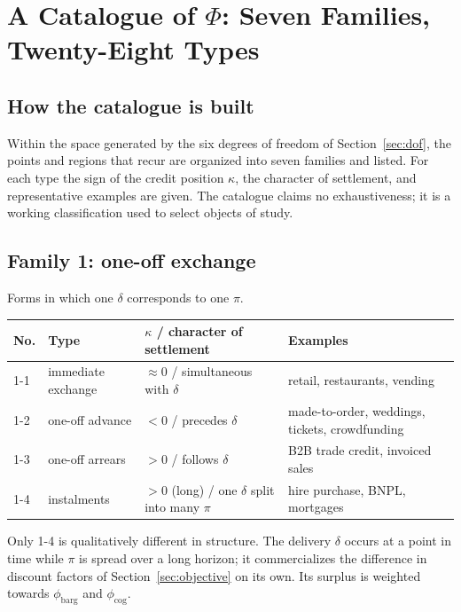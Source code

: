 \chapter{A Catalogue of \texorpdfstring{$\Phi$}{Phi}: Seven Families, Twenty-Eight Types}
\label{ch:catalog}

\section{How the catalogue is built}

Within the space generated by the six degrees of freedom of Section~\ref{sec:dof}, the
points and regions that recur are organized into seven families and listed. For each type
the sign of the credit position $\kappa$, the character of settlement, and representative
examples are given. The catalogue claims no exhaustiveness; it is a working classification
used to select objects of study.

\section{Family 1: one-off exchange}

Forms in which one $\delta$ corresponds to one $\pi$.

\begin{center}
\begin{tabularx}{\textwidth}{@{}llXX@{}}
\toprule
No. & Type & $\kappa$ / character of settlement & Examples \\
\midrule
1-1 & immediate exchange & $\approx 0$ / simultaneous with $\delta$ & retail, restaurants, vending \\
1-2 & one-off advance & $<0$ / precedes $\delta$ & made-to-order, weddings, tickets, crowdfunding \\
1-3 & one-off arrears & $>0$ / follows $\delta$ & B2B trade credit, invoiced sales \\
1-4 & instalments & $>0$ (long) / one $\delta$ split into many $\pi$ & hire purchase, BNPL, mortgages \\
\bottomrule
\end{tabularx}
\label{tab:family-1-catalog}
\end{center}

Only 1-4 is qualitatively different in structure. The delivery $\delta$ occurs at a point in
time while $\pi$ is spread over a long horizon; it commercializes the difference in discount
factors of Section~\ref{sec:objective} on its own. Its surplus is weighted towards
$\phi_{\mathrm{barg}}$ and $\phi_{\mathrm{cog}}$.

